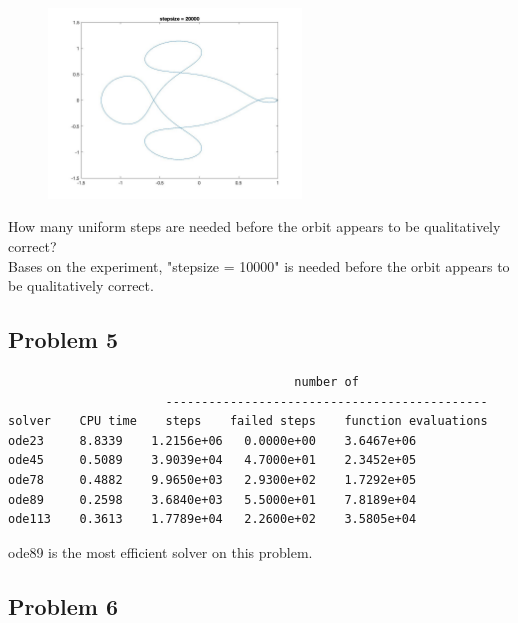\documentclass[11pt,fleqn]{exam}
\begin{document}
\begin{figure}[H]
  	\centering
  	\includegraphics[width=0.6\textwidth]{q44.jpg}
\end{figure}	

How many uniform steps are needed before the orbit appears to be qualitatively correct?\\
Bases on the experiment, "stepsize = 10000" is needed before the orbit appears to be qualitatively correct.

\subsection*{Problem 5}
\begin{lstlisting}
                                        number of
                      ---------------------------------------------
solver    CPU time    steps    failed steps    function evaluations
ode23     8.8339    1.2156e+06   0.0000e+00    3.6467e+06
ode45     0.5089    3.9039e+04   4.7000e+01    2.3452e+05
ode78     0.4882    9.9650e+03   2.9300e+02    1.7292e+05
ode89     0.2598    3.6840e+03   5.5000e+01    7.8189e+04
ode113    0.3613    1.7789e+04   2.2600e+02    3.5805e+04
\end{lstlisting}

\noindent
ode89 is the most efficient solver on this problem.

\subsection*{Problem 6}
\end{document}
